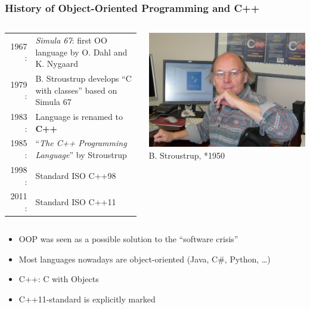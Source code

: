 \documentclass{slides}
\begin{document}
\begin{frame}
  \frametitle{History of Object-Oriented Programming and C++}
  \begin{columns}[c,onlytextwidth]
    \begin{tabular}{r<{:}p{}}
      1967 & \textit{Simula 67}: first OO language by O. Dahl and K. Nygaard\\
      1979 & B. Stroustrup develops ``C with classes'' based on Simula 67\\
      1983 & Language is renamed to \textbf{C++}\\
      1985 & ``\emph{The C++ Programming Language}'' by Stroustrup\\
      1998 & Standard ISO C++98\\
      2011 & Standard ISO C++11
    \end{tabular}

    \centering
    \includegraphics[height=0.25\textheight]{stroustrup}\\
    {\small B. Stroustrup, *1950}
  \end{columns}

  \vspace{0.5em}
  \begin{itemize}
  \item OOP was seen as a possible solution to the ``software crisis''
  \item Most languages nowadays are object-oriented (\eg Java, C\#, Python, \dots)
  \item C++: C with Objects
  \item C++11-standard is explicitly marked
  \end{itemize}

\end{frame}
\end{document}
